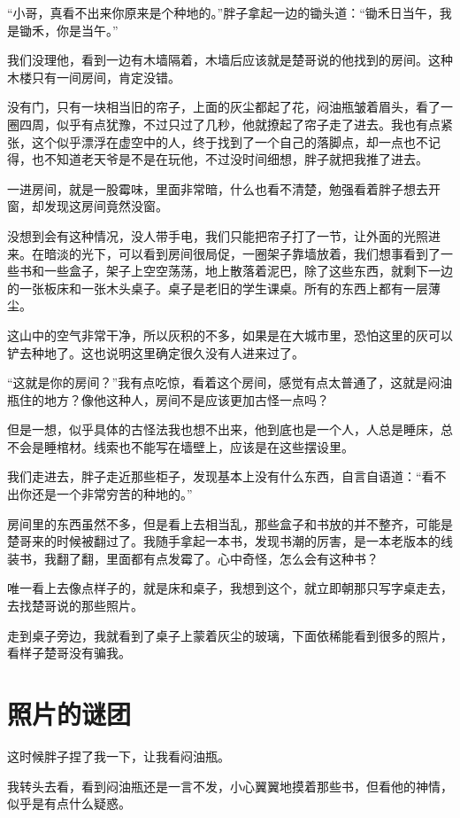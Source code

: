 “小哥，真看不出来你原来是个种地的。”胖子拿起一边的锄头道：“锄禾日当午，我是锄禾，你是当午。”

我们没理他，看到一边有木墙隔着，木墙后应该就是楚哥说的他找到的房间。这种木楼只有一间房间，肯定没错。

没有门，只有一块相当旧的帘子，上面的灰尘都起了花，闷油瓶皱着眉头，看了一圈四周，似乎有点犹豫，不过只过了几秒，他就撩起了帘子走了进去。我也有点紧张，这个似乎漂浮在虚空中的人，终于找到了一个自己的落脚点，却一点也不记得，也不知道老天爷是不是在玩他，不过没时间细想，胖子就把我推了进去。

一进房间，就是一股霉味，里面非常暗，什么也看不清楚，勉强看着胖子想去开窗，却发现这房间竟然没窗。

没想到会有这种情况，没人带手电，我们只能把帘子打了一节，让外面的光照进来。在暗淡的光下，可以看到房间很局促，一圈架子靠墙放着，我们想事看到了一些书和一些盒子，架子上空空荡荡，地上散落着泥巴，除了这些东西，就剩下一边的一张板床和一张木头桌子。桌子是老旧的学生课桌。所有的东西上都有一层薄尘。

这山中的空气非常干净，所以灰积的不多，如果是在大城市里，恐怕这里的灰可以铲去种地了。这也说明这里确定很久没有人进来过了。

“这就是你的房间？”我有点吃惊，看着这个房间，感觉有点太普通了，这就是闷油瓶住的地方？像他这种人，房间不是应该更加古怪一点吗？

但是一想，似乎具体的古怪法我也想不出来，他到底也是一个人，人总是睡床，总不会是睡棺材。线索也不能写在墙壁上，应该是在这些摆设里。

我们走进去，胖子走近那些柜子，发现基本上没有什么东西，自言自语道：“看不出你还是一个非常穷苦的种地的。”

房间里的东西虽然不多，但是看上去相当乱，那些盒子和书放的并不整齐，可能是楚哥来的时候被翻过了。我随手拿起一本书，发现书潮的厉害，是一本老版本的线装书，我翻了翻，里面都有点发霉了。心中奇怪，怎么会有这种书？

唯一看上去像点样子的，就是床和桌子，我想到这个，就立即朝那只写字桌走去，去找楚哥说的那些照片。

走到桌子旁边，我就看到了桌子上蒙着灰尘的玻璃，下面依稀能看到很多的照片，看样子楚哥没有骗我。

\chapter{照片的谜团}

这时候胖子捏了我一下，让我看闷油瓶。

我转头去看，看到闷油瓶还是一言不发，小心翼翼地摸着那些书，但看他的神情，似乎是有点什么疑惑。

